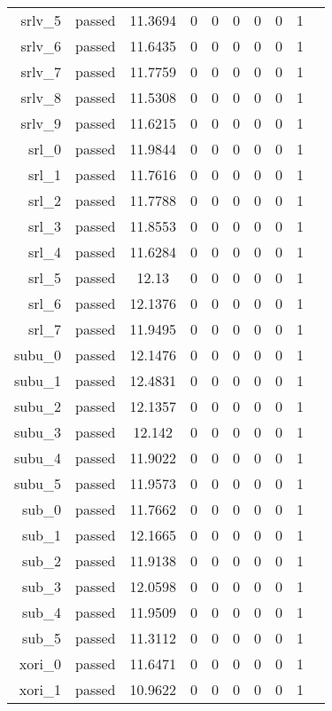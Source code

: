 \begin{longtable}{r|ccccccccc}
    srlv\_5 & passed & 11.3694 & 0 & 0 & 0 & 0 & 0 & 1 \\
    srlv\_6 & passed & 11.6435 & 0 & 0 & 0 & 0 & 0 & 1 \\
    srlv\_7 & passed & 11.7759 & 0 & 0 & 0 & 0 & 0 & 1 \\
    srlv\_8 & passed & 11.5308 & 0 & 0 & 0 & 0 & 0 & 1 \\
    srlv\_9 & passed & 11.6215 & 0 & 0 & 0 & 0 & 0 & 1 \\
    srl\_0 & passed & 11.9844 & 0 & 0 & 0 & 0 & 0 & 1 \\
    srl\_1 & passed & 11.7616 & 0 & 0 & 0 & 0 & 0 & 1 \\
    srl\_2 & passed & 11.7788 & 0 & 0 & 0 & 0 & 0 & 1 \\
    srl\_3 & passed & 11.8553 & 0 & 0 & 0 & 0 & 0 & 1 \\
    srl\_4 & passed & 11.6284 & 0 & 0 & 0 & 0 & 0 & 1 \\
    srl\_5 & passed & 12.13 & 0 & 0 & 0 & 0 & 0 & 1 \\
    srl\_6 & passed & 12.1376 & 0 & 0 & 0 & 0 & 0 & 1 \\
    srl\_7 & passed & 11.9495 & 0 & 0 & 0 & 0 & 0 & 1 \\
    subu\_0 & passed & 12.1476 & 0 & 0 & 0 & 0 & 0 & 1 \\
    subu\_1 & passed & 12.4831 & 0 & 0 & 0 & 0 & 0 & 1 \\
    subu\_2 & passed & 12.1357 & 0 & 0 & 0 & 0 & 0 & 1 \\
    subu\_3 & passed & 12.142 & 0 & 0 & 0 & 0 & 0 & 1 \\
    subu\_4 & passed & 11.9022 & 0 & 0 & 0 & 0 & 0 & 1 \\
    subu\_5 & passed & 11.9573 & 0 & 0 & 0 & 0 & 0 & 1 \\
    sub\_0 & passed & 11.7662 & 0 & 0 & 0 & 0 & 0 & 1 \\
    sub\_1 & passed & 12.1665 & 0 & 0 & 0 & 0 & 0 & 1 \\
    sub\_2 & passed & 11.9138 & 0 & 0 & 0 & 0 & 0 & 1 \\
    sub\_3 & passed & 12.0598 & 0 & 0 & 0 & 0 & 0 & 1 \\
    sub\_4 & passed & 11.9509 & 0 & 0 & 0 & 0 & 0 & 1 \\
    sub\_5 & passed & 11.3112 & 0 & 0 & 0 & 0 & 0 & 1 \\
    xori\_0 & passed & 11.6471 & 0 & 0 & 0 & 0 & 0 & 1 \\
    xori\_1 & passed & 10.9622 & 0 & 0 & 0 & 0 & 0 & 1 \\

\end{longtable}
